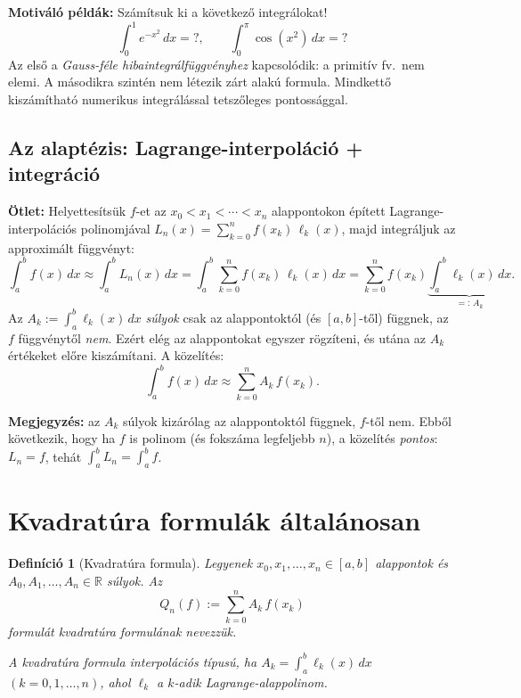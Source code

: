 \documentclass[a4paper,12pt]{article}
\theoremstyle{mydef}
\newtheorem{definicio}[tetel]{Definíció}
\newcommand{\R}{\mathbb{R}}
\begin{document}
\begin{mdframed}[backgroundcolor=exbg,linewidth=0pt,innertopmargin=6pt,innerbottommargin=6pt]
\textbf{Motiváló példák:} Számítsuk ki a következő integrálokat!
\[
  \int_0^1 e^{-x^2}\,dx = ?,\qquad \int_0^\pi \cos(x^2)\,dx = ?
\]
Az első a \emph{Gauss-féle hibaintegrálfüggvényhez} kapcsolódik: a primitív fv.\ nem
elemi. A másodikra szintén nem létezik zárt alakú formula. Mindkettő kiszámítható
numerikus integrálással tetszőleges pontossággal.
\end{mdframed}

\subsection*{Az alaptézis: Lagrange-interpoláció + integráció}

\textbf{Ötlet:} Helyettesítsük $f$-et az $x_0 < x_1 < \cdots < x_n$ alappontokon
épített Lagrange-interpolációs polinomjával $L_n(x) = \sum_{k=0}^n f(x_k)\,\ell_k(x)$,
majd integráljuk az approximált függvényt:
\[
  \int_a^b f(x)\,dx \approx \int_a^b L_n(x)\,dx
  = \int_a^b \sum_{k=0}^n f(x_k)\,\ell_k(x)\,dx
  = \sum_{k=0}^n f(x_k) \underbrace{\int_a^b \ell_k(x)\,dx}_{=:\,A_k}.
\]
Az $A_k := \int_a^b \ell_k(x)\,dx$ \emph{súlyok} csak az alappontoktól (és $[a,b]$-től)
függnek, az $f$ függvénytől \emph{nem}. Ezért elég az alappontokat egyszer rögzíteni,
és utána az $A_k$ értékeket előre kiszámítani. A közelítés:
\[
  \boxed{\int_a^b f(x)\,dx \approx \sum_{k=0}^n A_k\,f(x_k).}
\]

\textbf{Megjegyzés:} az $A_k$ súlyok kizárólag az alappontoktól függnek, $f$-től nem.
Ebből következik, hogy ha $f$ is polinom (és fokszáma legfeljebb $n$), a közelítés
\emph{pontos}: $L_n = f$, tehát $\int_a^b L_n = \int_a^b f$.

\section{Kvadratúra formulák általánosan}
\label{sec:kvadratura}

\begin{mdframed}[backgroundcolor=defbg,linewidth=0pt,innertopmargin=8pt,innerbottommargin=8pt]
\begin{definicio}[Kvadratúra formula]
Legyenek $x_0, x_1, \ldots, x_n \in [a,b]$ \emph{alappontok} és $A_0, A_1, \ldots, A_n \in \R$
\emph{súlyok}. Az
\[
  Q_n(f) := \sum_{k=0}^n A_k\,f(x_k)
\]
formulát \emph{kvadratúra formulának} nevezzük.

A kvadratúra formula \emph{interpolációs típusú}, ha $A_k = \int_a^b \ell_k(x)\,dx$
$(k = 0, 1, \ldots, n)$, ahol $\ell_k$ a $k$-adik Lagrange-alappolinom.
\end{definicio}
\end{mdframed}
\end{document}
